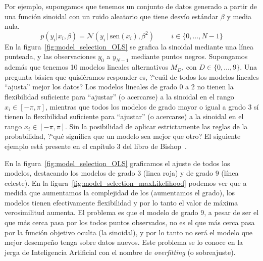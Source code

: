 \documentclass[a4paper,11pt]{book}
\newcommand{\N}{\mathcal{N}}
\theoremstyle{definition}
\begin{document}

Por ejemplo, supongamos que tenemos un conjunto de datos generado a partir de una funci\'on sinoidal con un ruido aleatorio que tiene desv\'io est\'andar $\beta$ y media nula.
%
\begin{equation*}
p(y_i|x_i,\beta) = \N(y_i \,| \, \text{sen}(x_i), \beta^2)  \hspace{1cm} \text{$i \in \{0,\dots,N-1\}$}
\end{equation*}
%
En la figura~\ref{fig:model_selection_OLS} se grafica la sinoidal mediante una l\'inea punteada, y las observaciones $y_0$ a $y_{N-1}$ mediante puntos negros.
%
Supongamos adem\'as que tenemos 10 modelos lineales alternativos $M_D$, con $D \in \{0, \dots, 9\}$.
%
Una pregunta b\'asica que quisi\'eramos responder es, ?`cu\'al de todos los modelos lineales ``ajusta'' mejor los datos?
%
Los modelos lineales de grado 0 a 2 no tienen la flexibilidad suficiente para ``ajustar'' (o acercarse) a la sinoidal en el rango $x_i \in [-\pi, \pi]$, mientras que todos los modelos de grado mayor o igual a grado 3 s\'i tienen la flexibilidad suficiente para ``ajustar'' (o acercarse) a la sinoidal en el rango $x_i \in [-\pi, \pi]$.
%
Sin la posibilidad de aplicar estrictamente las reglas de la probabilidad, ?`qu\'e significa que un modelo sea mejor que otro?
%
El siguiente ejemplo est\'a presente en el cap\'itulo 3 del libro de Bishop~\cite{Bishop2006}.

%

En la figura~\ref{fig:model_selection_OLS} graficamos el ajuste de todos los modelos, destacando los modelos de grado 3 (linea roja) y de grado 9 (l\'inea celeste).
%
En la figura~\ref{fig:model_selection_maxLikelihood} podemos ver que a medida que aumentamos la complejidad de los (aumentamos el grado), los modelos tienen efectivamente flexibilidad y por lo tanto el valor de m\'axima verosimilitud aumenta.
%
El problema es que el modelo de grado 9, a pesar de ser el que m\'as cerca pasa por los todos puntos observados, no es el que m\'as cerca pasa por la funci\'on objetivo oculta (la sinoidal), y por lo tanto no ser\'a el modelo que mejor desempe\~no tenga sobre datos nuevos.
%
Este problema se lo conoce en la jerga de Inteligencia Artificial con el nombre de \emph{overfitting} (o sobreajuste).

\end{document}

